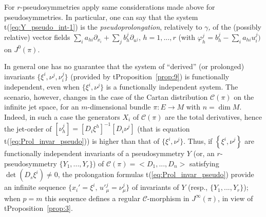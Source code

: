 \documentclass[12pt,english]{elsarticle}
\theoremstyle{plain}
\theoremstyle{plain}
\theoremstyle{remark}
\theoremstyle{plain}
\theoremstyle{definition}
\theoremstyle{definition}
\begin{document}
  For $r$-pseudosymmetries apply same considerations made above for pseudosymmetries.
In particular, one can say that the system t{(\ref{eq:Y_pseudo_int-1})} is
the \textit{pseudoprolongation}, relatively to \textit{$\gamma $,} of the
(possibly relative) vector fields
$\sum _{i}a_{hi}\partial _{x_{i}}+\sum _{j}b_{h}^{j}\partial _{u^{j}}$,
$h=1,...,r$ (with
$\varphi _{h}^{j}=b_{h}^{j}-\sum _{i}a_{hi}u_{i}^{j})$ on
$J^{0}(\pi )$.



In general one has no guarantee that the system of ``derived'' (or prolonged)
invariants $\{\xi ^{i},\nu ^{j},\nu _{i}^{j}\}$ (provided by t{Proposition~\ref{prop:9}}) is functionally independent, even when
$\{\xi ^{i},\nu ^{j}\}$ is a functionally independent system. The scenario,
however, changes in the case of the Cartan distribution
$\mathcal{C}(\pi )$ on the infinite jet space, for an $m$-dimensional bundle
$\pi :E\rightarrow M$ with $n=\dim M$. Indeed, in such a case the generators
$X_{i}$ of $\mathcal{C}(\pi )$ are the total derivatives, hence the jet-order
of
$\left [\nu _{h}^{j}\right ]=\left [D_{i}\xi ^{h}\right ]^{-1}\left [D_{i}
\nu ^{j}\right ]$ (that is equation t{(\ref{eq:Prol_invar_pseudo})}) is higher
than that of $\{\xi ^{i},\nu ^{j}\}$. Thus, if
$\left \{ \xi ^{i},\nu ^{j}\right \} $ are functionally independent invariants
of a pseudosymmetry $Y$ (or, an $r$-pseudosymmetry
$\{Y_{1},...,Y_{r}\}$) of
$\mathcal{\mathcal{C}}(\pi )=<D_{1},...,D_{n}>$ satisfying
$\det \left (D_{s}\xi ^{i}\right )\neq 0$, the prolongation formulas t{(\ref{eq:Prol_invar_pseudo})}
provide an infinite sequence
$\{x_{i}'=\xi ^{i},\,u'{}_{\mu}^{j}=\nu _{\mu}^{j}\}$ of invariants of
$Y$ (resp., $\{Y_{1},...,Y_{r}\}$); when $p=m$ this sequence defines a
regular $\mathcal{C}$-morphism in $J^{\infty}(\pi )$, in view of t{Proposition~\ref{prop:3}}.
\end{document}
